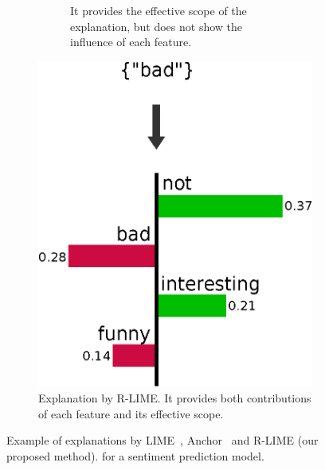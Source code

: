 \documentclass[11pt]{article}
\begin{document}
\begin{figure}[tbp]
\begin{subfigure}[t]{0.45\textwidth}
\begin{subfigure}[t]{\textwidth}
{        It provides the effective scope of the explanation,
        but does not show the influence of each feature.
      }\label{fig:example-anchor}
    \end{subfigure}
  \end{subfigure}
  \hspace{0.3cm}
  \begin{subfigure}[t]{0.45\textwidth}
    \centering
    \ifnum{}
      \vspace{-1.79cm}
    \else
      \vspace{-2.24cm}
    \fi
    \includegraphics[scale=\scale]{example-rlime}
    \caption{%
      Explanation by R-LIME\@.
      It provides both contributions of each feature and
      its effective scope.
    }\label{fig:example-rlime}
  \end{subfigure}
  \caption[Example of explanations by LIME, Anchor and R-LIME]{%
    Example of explanations by LIME~\cite{ribeiro2016why},
    Anchor~\cite{ribeiro2018anchors} and R-LIME (our proposed method).
    for a sentiment prediction model.
  }\label{fig:example}
\end{figure}
\end{document}
